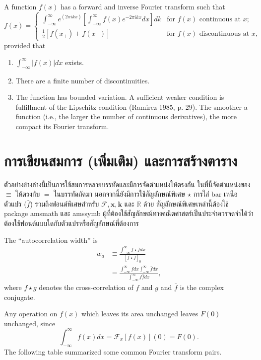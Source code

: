 \documentclass[a4paper,12pt]{article}
\begin{document}
A function $f(x)$ has a forward and inverse Fourier transform such that
\begin{equation}
 f(x)= \begin{cases}
 \int_{-\infty}^\infty e^(2 \pi ikx) \left[\int_{-\infty}^\infty f(x)e^{-2\pi ikx} dx \right]dk
     & \text{for } f(x) \text{ continuous at } x; \\
 \frac{1}{2}[f(x_+)+f(x_-)]
     & \text{for } f(x) \text{ discontinuous at } x, 	
 \end{cases} 
\end{equation}
provided that
\begin{enumerate}
\item $\int_{-\infty}^\infty|f(x)|dx$ exists.
\item There are a finite number of discontinuities.
\item The function has bounded variation. A sufficient weaker condition is fulfillment of the Lipschitz condition (Ramirez 1985, p. 29). The smoother a function (i.e., the larger the number of continuous derivatives), the more compact its Fourier transform.
\end{enumerate}

\section{การเขียนสมการ (เพิ่มเติม) และการสร้างตาราง}
\label{Sec:Table}
ตัวอย่างข้างล่างนี้เป็นการใช้สมการหลายบรรทัดและมีการจัดตำแหน่งให้ตรงกัน ในที่นี้จัดตำแหน่งของ $\equiv$ ให้ตรงกับ $=$ ในบรรทัดถัดมา นอกจากนี้ยังมีการใช้สัญลักษณ์พิเศษ $\star$ การใส่ bar เหนือตัวแปร ($\bar{f}$) รวมถึงฟอนต์พิเศษสำหรับ $\mathcal{F}, \mathbf{x}, \mathbf{k}$ และ $\mathbb{R}$ ด้วย สัญลักษณ์พิเศษเหล่านี้ต้องใช้ package amsmath และ amssymb ผู้ที่ต้องใช้สัญลักษณ์ทางคณิตศาสตร์เป็นประจำควรจดจำได้ว่าต้องใช้ฟอนต์แบบใดกับตัวแปรหรือสัญลักษณ์ที่ต้องการ

The ``autocorrelation width'' is
\begin{align}
w_a	&\equiv	\frac{\int_{-\infty}^\infty f \star \bar{f}dx}{[f \star \bar{f}]_0}	\\
	&=	\frac{\int_{-\infty}^\infty f dx \int_{-\infty}^\infty \bar{f}dx}{\int_{-\infty}^\infty f \bar{f} dx},	
\end{align}
where $f \star g$ denotes the cross-correlation of $f$ and $g$ and $\bar{f}$ is the complex conjugate.

Any operation on $f(x)$ which leaves its area unchanged leaves $F(0)$ unchanged, since
\begin{equation}
 \int_{-\infty}^\infty f(x) dx = \mathcal{F}_x[f(x)](0)=F(0). 	
\end{equation}
The following table summarized some common Fourier transform pairs.
\end{document}
